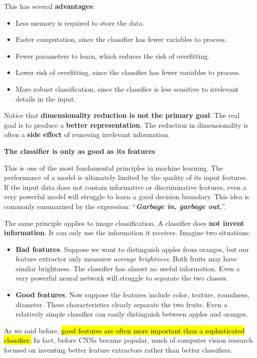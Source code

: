 \highspace
This has several \textbf{advantages}:
\begin{itemize}
    \item[\textcolor{Green3}{\faIcon{check}}] Less memory is required to store the data.
    \item[\textcolor{Green3}{\faIcon{check}}] Faster computation, since the classifier has fewer variables to process.
    \item[\textcolor{Green3}{\faIcon{check}}] Fewer parameters to learn, which reduces the risk of overfitting.
    \item[\textcolor{Green3}{\faIcon{check}}] Lower risk of overfitting, since the classifier has fewer variables to process.
    \item[\textcolor{Green3}{\faIcon{check}}] More robust classification, since the classifier is less sensitive to irrelevant details in the input.
\end{itemize}
Notice that \textbf{dimensionality reduction is not the primary goal}. The real goal is to produce a \textbf{better representation}. The reduction in dimensionality is often a \textbf{side effect} of removing irrelevant information.

\highspace
\begin{flushleft}
    \textcolor{Red2}{ \textbf{The classifier is only as good as its features}}
\end{flushleft}
This is one of the most fundamental principles in machine learning. The performance of a model is ultimately limited by the quality of its input features. If the input data does not contain informative or discriminative features, even a very powerful model will struggle to learn a good decision boundary. This idea is commonly summarized by the expression: ``\textbf{\emph{Garbage in, garbage out.}}''.

\highspace
The same principle applies to image classification. A classifier does \textbf{not invent information}. It can only use the information it receives. Imagine two situations:
\begin{itemize}
    \item \textbf{Bad features}. Suppose we want to distinguish apples from oranges, but our feature extractor only measures \emph{average brightness}. Both fruits may have similar brightness. The classifier has almost no useful information. Even a very powerful neural network will struggle to separate the two classes.
    
    \item \textbf{Good features}. Now suppose the features include color, texture, roundness, diameter. These characteristics clearly separate the two fruits. Even a relatively simple classifier can easily distinguish between apples and oranges.
\end{itemize}
As we said before, \hl{good features are often more important than a sophisticated classifier.} In fact, before CNNs became popular, much of computer vision research focused on inventing better feature extractors rather than better classifiers.

